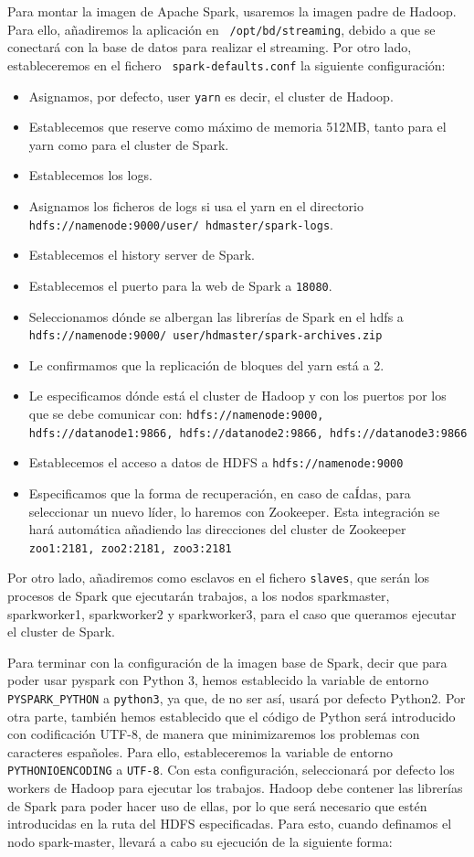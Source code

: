 Para montar la imagen de Apache Spark, usaremos la imagen padre de Hadoop.
Para ello, añadiremos la aplicación en {\tt
  /opt/bd/streaming}, debido a que se conectará con la base de datos para
realizar el streaming. Por otro lado, estableceremos en el fichero {\tt
  spark-defaults.conf} la siguiente configuración:
\begin{itemize}
\item Asignamos, por defecto, user {\tt yarn} es decir, el cluster de
  Hadoop.
\item Establecemos que reserve como máximo de memoria 512MB, tanto para el
  yarn como para el cluster de Spark.
\item Establecemos los logs.
\item Asignamos los ficheros de logs si usa el yarn en el directorio {\tt
    hdfs://namenode:9000/user/ hdmaster/spark-logs}.
\item Establecemos el history server de Spark.
\item Establecemos el puerto para la web de Spark a {\tt 18080}.
\item Seleccionamos dónde se albergan las librerías de Spark en el hdfs a
  {\tt hdfs://namenode:9000/ user/hdmaster/spark-archives.zip}
\item Le confirmamos que la replicación de bloques del yarn está a 2.
\item Le especificamos dónde está el cluster de Hadoop y con los puertos
  por los que se debe comunicar con: {\tt hdfs://namenode:9000,
    hdfs://datanode1:9866, hdfs://datanode2:9866, hdfs://datanode3:9866}
\item Establecemos el acceso a datos de HDFS a {\tt hdfs://namenode:9000}
\item Especificamos que la forma de recuperación, en caso de caÍdas, para
  seleccionar un nuevo líder, lo haremos con Zookeeper. Esta integración se
  hará automática añadiendo las direcciones del cluster de Zookeeper {\tt
    zoo1:2181, zoo2:2181, zoo3:2181}
\end{itemize}

Por otro lado, añadiremos como esclavos en el fichero {\tt slaves}, que
serán los procesos de Spark que ejecutarán trabajos, a los nodos
sparkmaster, sparkworker1, sparkworker2 y sparkworker3, para el caso que
queramos ejecutar el cluster de Spark.

Para terminar con la configuración de la imagen base de Spark, decir que
para poder usar pyspark con Python 3, hemos establecido la variable de
entorno {\tt PYSPARK\_PYTHON} a {\tt python3}, ya que, de no ser así, usará
por defecto Python2. Por otra parte, también hemos establecido que el
código de Python será introducido con codificación UTF-8, de manera que
minimizaremos los problemas con caracteres españoles. Para ello,
estableceremos la variable de entorno {\tt PYTHONIOENCODING} a {\tt UTF-8}.
Con esta configuración, seleccionará por defecto los workers de Hadoop para
ejecutar los trabajos. Hadoop debe contener las librerías de Spark para
poder hacer uso de ellas, por lo que será necesario que estén introducidas
en la ruta del HDFS especificadas. Para esto, cuando definamos el nodo
spark-master, llevará a cabo su ejecución de la siguiente forma:

